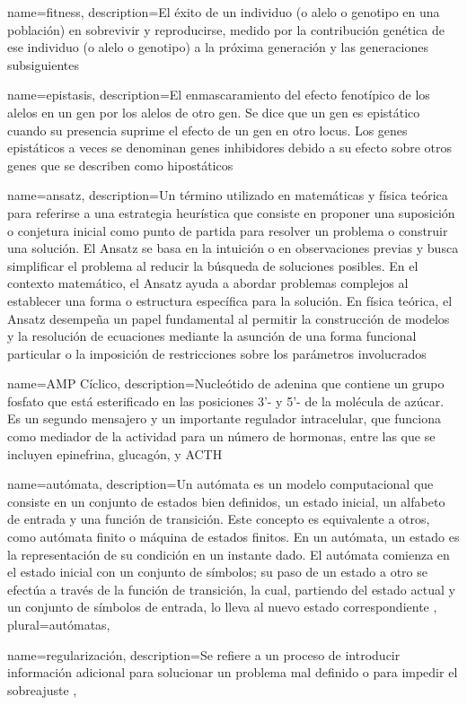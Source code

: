 {
	name=fitness,
	description={El éxito de un individuo (o alelo o genotipo en una población) en sobrevivir y reproducirse, medido por la contribución genética de ese individuo (o alelo o genotipo) a la próxima generación y las generaciones subsiguientes}
}

{
	name=epistasis,
	description={El enmascaramiento del efecto fenotípico de los alelos en un gen por los alelos de otro gen. Se dice que un gen es epistático cuando su presencia suprime el efecto de un gen en otro locus. Los genes epistáticos a veces se denominan genes inhibidores debido a su efecto sobre otros genes que se describen como hipostáticos}
}

{
	name=ansatz,
	description={Un término utilizado en matemáticas y física teórica para referirse a una estrategia heurística que consiste en proponer una suposición o conjetura inicial como punto de partida para resolver un problema o construir una solución. El Ansatz se basa en la intuición o en observaciones previas y busca simplificar el problema al reducir la búsqueda de soluciones posibles. En el contexto matemático, el Ansatz ayuda a abordar problemas complejos al establecer una forma o estructura específica para la solución. En física teórica, el Ansatz desempeña un papel fundamental al permitir la construcción de modelos y la resolución de ecuaciones mediante la asunción de una forma funcional particular o la imposición de restricciones sobre los parámetros involucrados}
}


{
	name=AMP Cíclico,
	description={Nucleótido de adenina que contiene un grupo fosfato que está esterificado en las posiciones 3'- y 5'- de la molécula de azúcar. Es un segundo mensajero y un importante regulador intracelular, que funciona como mediador de la actividad para un número de hormonas, entre las que se incluyen epinefrina, glucagón, y ACTH}
}


{
	name={autómata},
	description={Un autómata es un modelo computacional que consiste en un conjunto de estados bien definidos, un estado inicial, un alfabeto de entrada y una función de transición. Este concepto es equivalente a otros, como autómata finito o máquina de estados finitos. En un autómata, un estado es la representación de su condición en un instante dado. El autómata comienza en el estado inicial con un conjunto de símbolos; su paso de un estado a otro se efectúa a través de la función de transición, la cual, partiendo del estado actual y un conjunto de símbolos de entrada, lo lleva al nuevo estado correspondiente} ,
	plural={autómatas},
	} 
	
	
	{
		name={regularización},
		description={Se refiere a un proceso de introducir información adicional para solucionar un problema mal definido o para impedir el sobreajuste} ,
			} 
